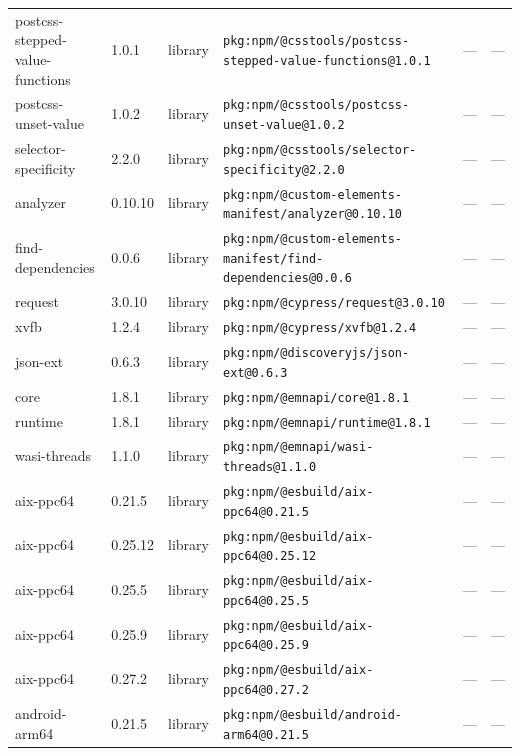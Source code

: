 \documentclass[11pt,a4paper]{article}
\begin{document}
\begin{longtable}{|p{4cm}|p{2cm}|p{1.6cm}|p{5cm}|p{1.5cm}|p{3.5cm}|}
\raggedright postcss-stepped-value-functions & 1.0.1 & library & \small\texttt{pkg:npm/@csstools/postcss-stepped-value-functions@1.0.1} & — & \small — \\
\raggedright postcss-unset-value & 1.0.2 & library & \small\texttt{pkg:npm/@csstools/postcss-unset-value@1.0.2} & — & \small — \\
\raggedright selector-specificity & 2.2.0 & library & \small\texttt{pkg:npm/@csstools/selector-specificity@2.2.0} & — & \small — \\
\raggedright analyzer & 0.10.10 & library & \small\texttt{pkg:npm/@custom-elements-manifest/analyzer@0.10.10} & — & \small — \\
\raggedright find-dependencies & 0.0.6 & library & \small\texttt{pkg:npm/@custom-elements-manifest/find-dependencies@0.0.6} & — & \small — \\
\raggedright request & 3.0.10 & library & \small\texttt{pkg:npm/@cypress/request@3.0.10} & — & \small — \\
\raggedright xvfb & 1.2.4 & library & \small\texttt{pkg:npm/@cypress/xvfb@1.2.4} & — & \small — \\
\raggedright json-ext & 0.6.3 & library & \small\texttt{pkg:npm/@discoveryjs/json-ext@0.6.3} & — & \small — \\
\raggedright core & 1.8.1 & library & \small\texttt{pkg:npm/@emnapi/core@1.8.1} & — & \small — \\
\raggedright runtime & 1.8.1 & library & \small\texttt{pkg:npm/@emnapi/runtime@1.8.1} & — & \small — \\
\raggedright wasi-threads & 1.1.0 & library & \small\texttt{pkg:npm/@emnapi/wasi-threads@1.1.0} & — & \small — \\
\raggedright aix-ppc64 & 0.21.5 & library & \small\texttt{pkg:npm/@esbuild/aix-ppc64@0.21.5} & — & \small — \\
\raggedright aix-ppc64 & 0.25.12 & library & \small\texttt{pkg:npm/@esbuild/aix-ppc64@0.25.12} & — & \small — \\
\raggedright aix-ppc64 & 0.25.5 & library & \small\texttt{pkg:npm/@esbuild/aix-ppc64@0.25.5} & — & \small — \\
\raggedright aix-ppc64 & 0.25.9 & library & \small\texttt{pkg:npm/@esbuild/aix-ppc64@0.25.9} & — & \small — \\
\raggedright aix-ppc64 & 0.27.2 & library & \small\texttt{pkg:npm/@esbuild/aix-ppc64@0.27.2} & — & \small — \\
\raggedright android-arm64 & 0.21.5 & library & \small\texttt{pkg:npm/@esbuild/android-arm64@0.21.5} & — & \small — \\

\end{longtable}
\end{document}
